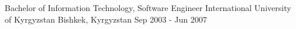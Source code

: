 

\begin{cventries}
  \cventry
    {Bachelor of Information Technology, Software Engineer} %
    {International University of Kyrgyzstan} %
    {Bishkek, Kyrgyzstan} %
    {Sep 2003 - Jun 2007} %
    {}
\end{cventries}
